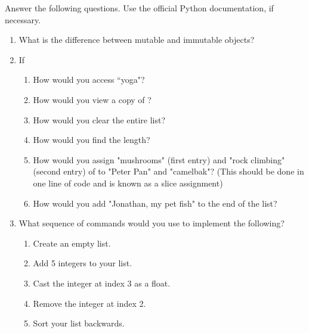 \begin{problem}
Answer the following questions. Use the official Python documentation, if necessary.

\begin{enumerate}

\item What is the difference between mutable and immutable objects?
\item If 
\begin{enumerate}

	\item How would you access ``yoga"? 
	\item How would you view a copy of ?
	\item How would you clear the entire list? 
	\item How would you find the length? 
	\item How would you assign "mushrooms" (first entry) and "rock climbing" (second entry) 
	of  to "Peter Pan" and "camelbak"? 
	(This should be done in one line of code and is known as a slice assignment)
	\item How would you add "Jonathan, my pet fish" to the end of the list?

\end{enumerate}
\item What sequence of commands would you use to implement the following?

\begin{enumerate}
\item Create an empty list. 
\item Add 5 integers to your list. 
\item Cast the integer at index 3 as a float.
\item Remove the integer at index 2. 
\item Sort your list backwards.

\end{enumerate}
\end{enumerate}
\end{problem}


